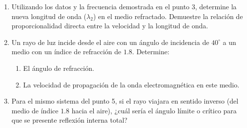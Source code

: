 \documentclass[11pt, letterpaper]{article}
\newif\ifmostrarrespuestas
\newcommand{\respuesta}[1]{
	\ifmostrarrespuestas
	\par\vspace{0.2cm}
	\textbf{\textcolor{blue}{Solución:}} \textcolor{blue}{#1}
	\vspace{0.4cm}
	\else
	\fi
}
\begin{document}
\begin{enumerate}[leftmargin=*, itemsep=0.8cm]
		\item Utilizando los datos y la frecuencia demostrada en el punto 3, determine la nueva longitud de onda ($\lambda_2$) en el medio refractado. Demuestre la relación de proporcionalidad directa entre la velocidad y la longitud de onda.
		\respuesta{
			Sabiendo que $v_2 = 0.4 \text{ m/s}$ y que la frecuencia se mantiene constante en $f = 4 \text{ Hz}$: \\
			$\lambda_2 = \frac{v_2}{f} = \frac{0.4 \text{ m/s}}{4 \text{ Hz}} = 0.1 \text{ m}$. \\
			Si $v = \lambda \cdot f$ y $f$ es constante, $v$ y $\lambda$ son directamente proporcionales. Al disminuir la velocidad en el nuevo medio, la longitud de onda debe disminuir proporcionalmente.
		}
		
		\item Un rayo de luz incide desde el aire con un ángulo de incidencia de $40^\circ$ a un medio con un índice de refracción de $1.8$. Determine:
		\begin{enumerate}[label=\alph*., itemsep=0.2cm]
			\item El ángulo de refracción.
			\item La velocidad de propagación de la onda electromagnética en este medio.
		\end{enumerate}
		\respuesta{
			a) Ley de Snell: $n_1 \sin(\theta_1) = n_2 \sin(\theta_2) \implies 1 \cdot \sin(40^\circ) = 1.8 \cdot \sin(\theta_2)$.\\
			$\sin(\theta_2) = \frac{0.6428}{1.8} \approx 0.357 \implies \theta_2 = \arcsin(0.357) \approx 20.92^\circ$.\\
			b) Índice $n = \frac{c}{v} \implies v = \frac{c}{n} = \frac{3 \times 10^8 \text{ m/s}}{1.8} \approx 1.67 \times 10^8 \text{ m/s}$.
		}
		
		\item Para el mismo sistema del punto 5, si el rayo viajara en sentido inverso (del medio de índice $1.8$ hacia el aire), ¿cuál sería el ángulo límite o crítico para que se presente reflexión interna total?
		\respuesta{
			El ángulo límite ($\theta_c$) ocurre cuando el ángulo de refracción es $90^\circ$ ($\sin 90^\circ = 1$).\\
			$n_1 \sin(\theta_c) = n_2 \sin(90^\circ) \implies 1.8 \sin(\theta_c) = 1(1) \implies \sin(\theta_c) = \frac{1}{1.8} \approx 0.555$.\\
			$\theta_c = \arcsin(0.555) \approx 33.75^\circ$.
		}
		

\end{enumerate}
\end{document}
